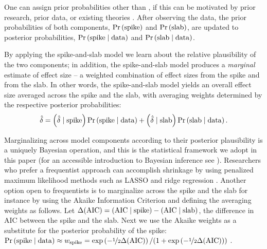 \documentclass[a4paper]{article}
\newcommand{\shypo}[1]{%
	\ifnum#1>0%
		\mathrm{slab}
	\else%
		\mathrm{spike}
	\fi%
}
\newcommand{\data}{\mathrm{data}}%
\newcommand{\obsDelta}{\hat{\delta}}
\newcommand{\probo}{\mathrm{Pr}}
\newcommand{\prob}[1]{\probo\left(#1\right)}
\newcommand{\AIC}{\mathrm{AIC}}
\newcommand{\DeltaAIC}{\Delta(\AIC)}
\newenvironment{revision}{\color{teal}}{\color{black}}
\begin{document}
\begin{revision}%
One can assign prior probabilities other than , if this can be motivated by prior research, prior data, or existing theories \parencite[e.g., ][]{wilson2018prior}.
After observing the data, the prior probabilities of both components, $\prob{\shypo{0}}$ and $\prob{\shypo{1}}$, are updated to posterior probabilities, $\prob{\shypo{0}\mid\data}$ and $\prob{\shypo{1}\mid\data}$.

By applying the spike-and-slab model we learn about the relative plausibility of the two components; in addition, the spike-and-slab model produces a \emph{marginal} estimate of effect size -- a weighted combination of effect sizes from the spike and from the slab. In other words, the spike-and-slab model yields an overall effect size averaged across the spike and the slab, with averaging weights determined by the respective posterior probabilities: 
\begin{align*}
	\obsDelta = \left(\obsDelta\mid\shypo{0}\right)\prob{\shypo{0}\mid\data} + \left(\obsDelta\mid\shypo{1}\right)\prob{\shypo{1}\mid\data}.
\end{align*}

Marginalizing across model components according to their posterior plausibility is a uniquely Bayesian operation, and this is the statistical framework we adopt in this paper (for an accessible introduction to Bayesian inference see \citeauthor{VandekerckhoveEtAl2018SI}). Researchers who prefer a frequentist approach can accomplish shrinkage by using penalized maximum likelihood methods such as LASSO and ridge regression \parencite{tibshirani2005sparsity}. Another option open to frequentists is to marginalize across the spike and the slab for instance by using the Akaike Information Criterion \parencite[AIC;][]{Akaike1973} and defining the averaging weights as follows. Let $\DeltaAIC = \left(\AIC\mid\shypo{0}\right) - \left(\AIC\mid\shypo{1}\right)$, the difference in AIC between the spike and the slab. Next we use the Akaike weights as a substitute for the posterior probability of the spike: 
$\prob{\shypo{0}\mid\data} \approx w_{\shypo{0}} = \exp\left(-\nicefrac{1}{2}\DeltaAIC\right) / (1 + \exp\left(-\nicefrac{1}{2}\DeltaAIC\right))$ 
\parencite{WagenmakersFarrell2004, BurnhamAnderson2002}. 


\end{revision}
\end{document}
